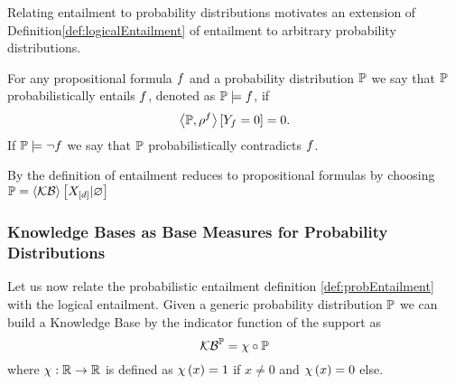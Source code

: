 %
Relating entailment to probability distributions motivates an extension of Definition\ref{def:logicalEntailment} of entailment to arbitrary probability distributions.


\begin{definition}\label{def:probEntailment}
	For any propositional formula $f$ and a probability distribution $\mathbb{P}$ we say that $\mathbb{P}$ probabilistically entails $f$, denoted as $\mathbb{P}\models f$, if
		\[ \left\langle \mathbb{P},\rho^{f}\right\rangle \left[ Y_{f}=0 \right] = 0 . \]
	If $\mathbb{P}\models\lnot f$ we say that $\mathbb{P}$ probabilistically contradicts $f$.
\end{definition}

%
By  the definition of entailment reduces to propositional formulas by choosing $\mathbb{P}=\left\langle \mathcal{KB}\right\rangle \left[ X_{[d]} | \varnothing \right]$









\subsubsection{Knowledge Bases as Base Measures for Probability Distributions}



Let us now relate the probabilistic entailment definition \ref{def:probEntailment} with the logical entailment.
Given a generic probability distribution $\mathbb{P}$ we can build a Knowledge Base by the indicator function of the support as 
	\[ \mathcal{KB}^{\mathbb{P}} = \chi \circ \mathbb{P} \]
where $\chi:\mathbb{R}\rightarrow \mathbb{R}$ is defined as $\chi\left(x\right)=1$ if $x\neq0$ and $\chi\left(x\right)=0$ else.

